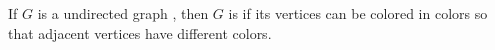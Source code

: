 
\begin{frame}{}
  \begin{definition}{}
    If $G$ is a  undirected graph ,
    then $G$ is  if its vertices can be colored
    in  colors so that adjacent vertices have different colors.
  \end{definition}
\end{frame}

\begin{frame}{}
\end{frame}

\begin{frame}{}
\end{frame}

\begin{frame}{}
\end{frame}

\begin{frame}{}
\end{frame}
